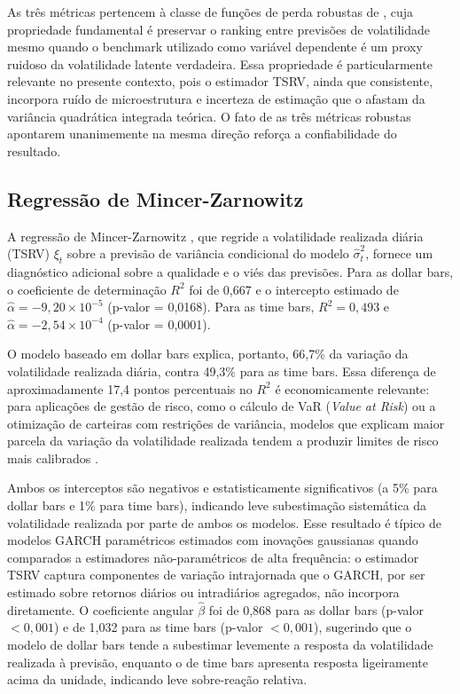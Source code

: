As três métricas pertencem à classe de funções de perda robustas de ,
cuja propriedade fundamental é preservar o ranking entre previsões de volatilidade mesmo
quando o benchmark utilizado como variável dependente é um proxy ruidoso da volatilidade
latente verdadeira. Essa propriedade é particularmente relevante no presente contexto,
pois o estimador TSRV, ainda que consistente, incorpora ruído de microestrutura e
incerteza de estimação que o afastam da variância quadrática integrada teórica. O fato
de as três métricas robustas apontarem unanimemente na mesma direção reforça a
confiabilidade do resultado.


\subsection{Regressão de Mincer-Zarnowitz}
\label{subsec:mz}

A regressão de Mincer-Zarnowitz \cite{mincer1969}, que regride a volatilidade
realizada diária (TSRV) $\xi_t$ sobre a previsão de variância condicional do modelo
 $\hat{\sigma}^2_t$, fornece um diagnóstico adicional sobre a qualidade e o viés das previsões.
Para as dollar bars, o coeficiente de determinação $R^2$ foi de 0,667 e o intercepto
estimado de $\hat{\alpha} = -9{,}20 \times 10^{-5}$ (p-valor = 0,0168). Para as time bars,
 $R^2 = 0{,}493$ e $\hat{\alpha} = -2{,}54 \times 10^{-4}$ (p-valor = 0,0001).

O modelo baseado em dollar bars explica, portanto, 66,7\% da variação da volatilidade
realizada diária, contra 49,3\% para as time bars. Essa diferença de aproximadamente
17,4 pontos percentuais no $R^2$ é economicamente relevante: para aplicações de gestão
de risco, como o cálculo de VaR (\textit{Value at Risk}) ou a otimização de carteiras
com restrições de variância, modelos que explicam maior parcela da variação da volatilidade
realizada tendem a produzir limites de risco mais calibrados \cite{andersen2003}.

Ambos os interceptos são negativos e estatisticamente significativos (a 5\% para dollar bars e 1\% para time bars), indicando leve
subestimação sistemática da volatilidade realizada por parte de ambos os modelos.
Esse resultado é típico de modelos GARCH paramétricos estimados com inovações gaussianas
quando comparados a estimadores não-paramétricos de alta frequência: o estimador TSRV
captura componentes de variação intrajornada que o GARCH, por ser estimado sobre retornos
diários ou intradiários agregados, não incorpora diretamente. O coeficiente angular $\hat{\beta}$
foi de 0,868 para as dollar bars (p-valor $< 0{,}001$) e de 1,032 para as time bars
(p-valor $< 0{,}001$), sugerindo que o modelo de dollar bars tende a subestimar levemente
a resposta da volatilidade realizada à previsão, enquanto o de time bars apresenta
resposta ligeiramente acima da unidade, indicando leve sobre-reação relativa.


